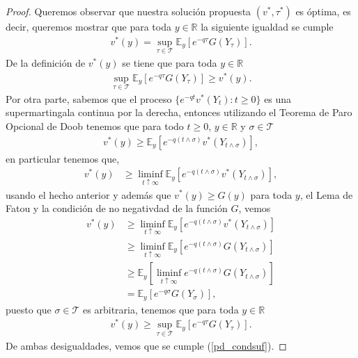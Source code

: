 \begin{proof}
Queremos observar que nuestra solución propuesta $(v^{*}, \tau^{*})$ es óptima, es decir, queremos mostrar que para toda $y \in \mathbb{R}$ la siguiente igualdad se cumple
\begin{align}
	v^{*}(y) = \sup_{\tau \in \mathcal{T}} \mathbb{E}_y \left[ e^{-q \tau} G(Y_{\tau}) \right]. \label{pd_condsuf}
\end{align}
De la definición de $v^{*}(y)$ se tiene que para toda $y \in \mathbb{R}$
\begin{align*}
	\sup_{\tau \in \mathcal{T}} \mathbb{E}_y \left[ e^{-q \tau} G(Y_{\tau}) \right] \geq v^{*}(y).
\end{align*}
Por otra parte, sabemos que el proceso $\{ e^{-qt} v^{*}(Y_t) : t \geq 0 \}$ es una supermartingala continua por la derecha, entonces utilizando el Teorema de Paro Opcional de Doob tenemos que para todo $t \geq 0$, $y \in \mathbb{R}$ y $\sigma \in \mathcal{T}$
\begin{align*}
	v^{*}(y) \geq \mathbb{E}_y \left[ e^{-q(t \wedge \sigma)} v^{*}(Y_{t \wedge \sigma}) \right],
\end{align*}
en particular tenemos que, 
\begin{align*}
	v^{*}(y) & \geq \liminf_{t \uparrow \infty} \mathbb{E}_y \left[ e^{-q(t \wedge \sigma)} v^{*}(Y_{t \wedge \sigma}) \right], 
\end{align*}
usando el hecho anterior y además que $v^{*}(y) \geq G(y)$ para toda $y$, el Lema de Fatou y la condición de no negativdad de la función $G$, vemos
\begin{align*}
	v^{*}(y) & \geq \liminf_{t \uparrow \infty} \mathbb{E}_y \left[ e^{-q(t \wedge \sigma)} v^{*}(Y_{t \wedge \sigma}) \right] \\
    & \geq \liminf_{t \uparrow \infty} \mathbb{E}_y \left[ e^{-q(t \wedge \sigma)} G(Y_{t \wedge \sigma}) \right] \\
    & \geq \mathbb{E}_y \left[ \liminf_{t \uparrow \infty} e^{-q(t \wedge \sigma)} G(Y_{t \wedge \sigma}) \right] \\
    & = \mathbb{E}_y \left[ e^{-q \sigma} G(Y_{\sigma}) \right],
\end{align*}
puesto que $\sigma \in \mathcal{T}$ es arbitraria, tenemos que para toda $y \in \mathbb{R}$
\begin{align*}
	 v^{*}(y) \geq \sup_{\tau \in \mathcal{T}} \mathbb{E}_y \left[ e^{-q \tau} G(Y_{\tau}) \right].
\end{align*}
De ambas desigualdades, vemos que se cumple (\ref{pd_condsuf}).
\end{proof}

